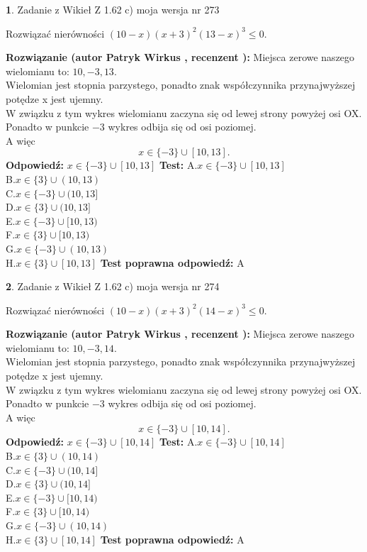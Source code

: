 \documentclass[12pt, a4paper]{article}
\theoremstyle{definition} %
\newtheorem{zad}{}
\newcommand{\zadStart}[1]{\begin{zad}#1\newline}
\newcommand{\zadStop}{\end{zad}}
\newcommand{\rozwStart}[2]{\noindent \textbf{Rozwiązanie (autor #1 , recenzent #2): }\newline}
\newcommand{\rozwStop}{\newline}
\newcommand{\odpStart}{\noindent \textbf{Odpowiedź:}\newline}
\newcommand{\odpStop}{\newline}
\newcommand{\testStart}{\noindent \textbf{Test:}\newline}
\newcommand{\testStop}{\newline}
\newcommand{\kluczStart}{\noindent \textbf{Test poprawna odpowiedź:}\newline}
\newcommand{\kluczStop}{\newline}
\begin{document}
\zadStart{Zadanie z Wikieł Z 1.62 c) moja wersja nr 273}

Rozwiązać nierówności $(10-x)(x+3)^{2}(13-x)^{3}\le0$.
\zadStop
\rozwStart{Patryk Wirkus}{}
Miejsca zerowe naszego wielomianu to: $10, -3, 13$.\\
Wielomian jest stopnia parzystego, ponadto znak współczynnika przy\linebreak najwyższej potędze x jest ujemny.\\ W związku z tym wykres wielomianu zaczyna się od lewej strony powyżej osi OX.\\
Ponadto w punkcie $-3$ wykres odbija się od osi poziomej.\\
A więc $$x \in \{-3\} \cup [10,13].$$
\rozwStop
\odpStart
$x \in \{-3\} \cup [10,13]$
\odpStop
\testStart
A.$x \in \{-3\} \cup [10,13]$\\
B.$x \in \{3\} \cup (10,13)$\\
C.$x \in \{-3\} \cup (10,13]$\\
D.$x \in \{3\} \cup (10,13]$\\
E.$x \in \{-3\} \cup [10,13)$\\
F.$x \in \{3\} \cup [10,13)$\\
G.$x \in \{-3\} \cup (10,13)$\\
H.$x \in \{3\} \cup [10,13]$
\testStop
\kluczStart
A
\kluczStop



\zadStart{Zadanie z Wikieł Z 1.62 c) moja wersja nr 274}

Rozwiązać nierówności $(10-x)(x+3)^{2}(14-x)^{3}\le0$.
\zadStop
\rozwStart{Patryk Wirkus}{}
Miejsca zerowe naszego wielomianu to: $10, -3, 14$.\\
Wielomian jest stopnia parzystego, ponadto znak współczynnika przy\linebreak najwyższej potędze x jest ujemny.\\ W związku z tym wykres wielomianu zaczyna się od lewej strony powyżej osi OX.\\
Ponadto w punkcie $-3$ wykres odbija się od osi poziomej.\\
A więc $$x \in \{-3\} \cup [10,14].$$
\rozwStop
\odpStart
$x \in \{-3\} \cup [10,14]$
\odpStop
\testStart
A.$x \in \{-3\} \cup [10,14]$\\
B.$x \in \{3\} \cup (10,14)$\\
C.$x \in \{-3\} \cup (10,14]$\\
D.$x \in \{3\} \cup (10,14]$\\
E.$x \in \{-3\} \cup [10,14)$\\
F.$x \in \{3\} \cup [10,14)$\\
G.$x \in \{-3\} \cup (10,14)$\\
H.$x \in \{3\} \cup [10,14]$
\testStop
\kluczStart
A
\kluczStop
\end{document}
